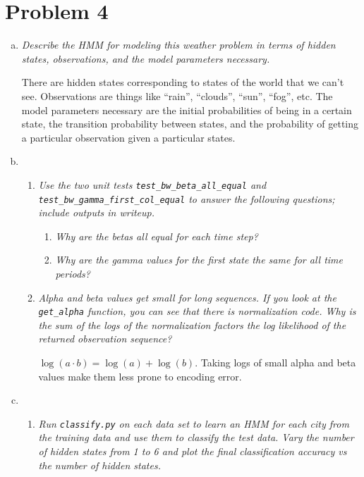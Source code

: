 \documentclass{article}
\begin{document}
\section*{Problem 4}
\begin{enumerate}[(a)]
\item \emph{Describe the HMM for modeling this weather problem in terms of hidden
  states, observations, and the model parameters necessary.}

  There are hidden states corresponding to states of the world that we can't
  see. Observations are things like ``rain'', ``clouds'', ``sun'', ``fog'', etc. 
  The model parameters necessary are the initial probabilities of being in a
  certain state, the transition probability between states, and the probability
  of getting a particular observation given a particular states. 

\item
  \begin{enumerate}
  \setcounter{enumiii}2
  \item \emph{Use the two unit tests \emph{\texttt{test\_bw\_beta\_all\_equal}}
    and
    \emph{\texttt{test\_bw\_gamma\_first\_col\_equal}} to answer the following questions;
    include outputs in writeup.}

    \begin{enumerate}[(1)]
    \item \emph{Why are the betas all equal for each time step?}
    \item \emph{Why are the gamma values for the first state the same for all time periods?}
    \end{enumerate}

  \item \emph{Alpha and beta values get small for long sequences. If you look at the
    \emph{\texttt{get\_alpha}} function, you can see that there is normalization code.
    Why is the sum of the logs of the normalization factors the log likelihood of
    the returned observation sequence?}

    $\log(a\cdot b)=\log(a)+\log(b)$. Taking logs of small alpha and beta values
    make them less prone to encoding error.

  \end{enumerate}

\item
  \begin{enumerate}
  \item \emph{Run \texttt{\emph{classify.py}} on each data set to learn an HMM
    for each city from the training data and use them to classify the test data.
    Vary the number of hidden states from 1 to 6 and plot the final classification
    accuracy vs the number of hidden states.}


\end{enumerate}
\end{enumerate}
\end{document}
